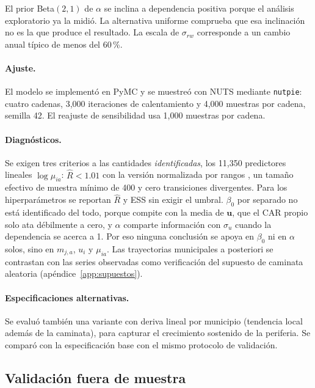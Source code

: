 El prior Beta$(2,1)$ de $\alpha$ se inclina a dependencia positiva porque el
análisis exploratorio ya la midió. La alternativa uniforme comprueba que esa
inclinación no es la que produce el resultado. La escala de $\sigma_{rw}$
corresponde a un cambio anual típico de menos del 60\,\%.

\paragraph{Ajuste.} El modelo se implementó en PyMC
\parencite{abrilpla2023pymc} y se muestreó con NUTS \parencite{hoffman2014nuts}
mediante \texttt{nutpie}: cuatro cadenas, 3,000 iteraciones de
calentamiento y 4,000 muestras por cadena, semilla 42. El reajuste de
sensibilidad usa 1,000 muestras por cadena.

\paragraph{Diagnósticos.} Se exigen tres criterios a las cantidades
\emph{identificadas}, los 11,350 predictores lineales $\log \mu_{ia}$:
$\hat{R} < 1.01$ con la versión normalizada por rangos
\parencite{vehtari2021rank}, un tamaño efectivo de muestra mínimo de 400 y cero
transiciones divergentes. Para los hiperparámetros se reportan $\hat{R}$ y ESS
sin exigir el umbral. $\beta_0$ por separado no está identificado del todo,
porque compite con la media de $\mathbf{u}$, que el CAR propio solo ata
débilmente a cero, y $\alpha$ comparte información con $\sigma_u$ cuando la
dependencia se acerca a 1. Por eso ninguna conclusión se apoya en $\beta_0$ ni
en $\alpha$ solos, sino en $m_{j,a}$, $u_i$ y $\mu_{ia}$. Las trayectorias municipales a
posteriori se contrastan con las series observadas como verificación del
supuesto de caminata aleatoria (apéndice~\ref{app:supuestos}).

\paragraph{Especificaciones alternativas.} Se evaluó también una variante con
deriva lineal por municipio (tendencia local además de la caminata), para
capturar el crecimiento sostenido de la periferia. Se comparó con la
especificación base con el mismo protocolo de validación.

\subsection{Validación fuera de muestra}\label{sec:met-validacion}

